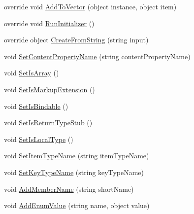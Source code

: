 \begin{DoxyCompactItemize}
\item 
override void \hyperlink{class_eli_log_in_app_1_1_eli_log_in_app___xaml_type_info_1_1_xaml_user_type_ad2a78d104d13536ed77b5d74c52d21af}{Add\+To\+Vector} (object instance, object item)
\item 
override void \hyperlink{class_eli_log_in_app_1_1_eli_log_in_app___xaml_type_info_1_1_xaml_user_type_ae66b79ba8e704f9f662faa257e17fe7e}{Run\+Initializer} ()
\item 
override object \hyperlink{class_eli_log_in_app_1_1_eli_log_in_app___xaml_type_info_1_1_xaml_user_type_a2ca01ffd5253dcc80ff2fbeb81509bbe}{Create\+From\+String} (string input)
\item 
void \hyperlink{class_eli_log_in_app_1_1_eli_log_in_app___xaml_type_info_1_1_xaml_user_type_adff0109146860359f64270e126c7ff45}{Set\+Content\+Property\+Name} (string content\+Property\+Name)
\item 
void \hyperlink{class_eli_log_in_app_1_1_eli_log_in_app___xaml_type_info_1_1_xaml_user_type_ad15c17048ffacdb0216e1aeb91305f75}{Set\+Is\+Array} ()
\item 
void \hyperlink{class_eli_log_in_app_1_1_eli_log_in_app___xaml_type_info_1_1_xaml_user_type_a5dad4447cab162df2a7f440d1d2b3103}{Set\+Is\+Markup\+Extension} ()
\item 
void \hyperlink{class_eli_log_in_app_1_1_eli_log_in_app___xaml_type_info_1_1_xaml_user_type_ad54def0c9c9ef0a07f42548f895f38d9}{Set\+Is\+Bindable} ()
\item 
void \hyperlink{class_eli_log_in_app_1_1_eli_log_in_app___xaml_type_info_1_1_xaml_user_type_a90707b6102a07fad88fe220d29902a5f}{Set\+Is\+Return\+Type\+Stub} ()
\item 
void \hyperlink{class_eli_log_in_app_1_1_eli_log_in_app___xaml_type_info_1_1_xaml_user_type_aa272264ba98bdfdfd550dcc3914cad12}{Set\+Is\+Local\+Type} ()
\item 
void \hyperlink{class_eli_log_in_app_1_1_eli_log_in_app___xaml_type_info_1_1_xaml_user_type_aef80979457c3078752cdaf45a5fa27a4}{Set\+Item\+Type\+Name} (string item\+Type\+Name)
\item 
void \hyperlink{class_eli_log_in_app_1_1_eli_log_in_app___xaml_type_info_1_1_xaml_user_type_a73575a24633520fdf4fd1b3cd57a09bd}{Set\+Key\+Type\+Name} (string key\+Type\+Name)
\item 
void \hyperlink{class_eli_log_in_app_1_1_eli_log_in_app___xaml_type_info_1_1_xaml_user_type_af98e518e1be5e292f754d5f4e82ac1ef}{Add\+Member\+Name} (string short\+Name)
\item 
void \hyperlink{class_eli_log_in_app_1_1_eli_log_in_app___xaml_type_info_1_1_xaml_user_type_a1261e283fe193030c59f5df8e2fc74ac}{Add\+Enum\+Value} (string name, object value)

\end{DoxyCompactItemize}

